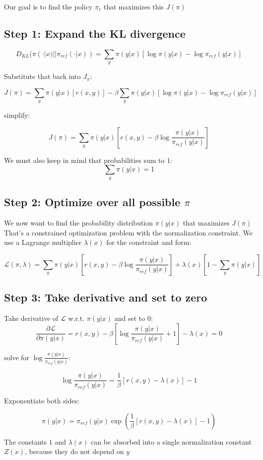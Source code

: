 \documentclass[]{article}
\begin{document}
Our goal is to find the policy $\pi_{r}$ that maximizes this $J(\pi)$
\subsection{Step 1: Expand the KL divergence}

$$
D_{KL}(\pi(\cdot|x) || \pi_{ref}(\cdot|x)) = \sum_{y}\pi(y|x)[\log\pi(y|x) - \log\pi_{ref}(y|x)]
$$

Substitute that back into $J_{\pi}$:

$$
J(\pi) = \sum_{y}\pi(y|x)[r(x,y)] - \beta\sum_{y}\pi(y|x)[\log\pi(y|x) - \log\pi_{ref}(y|x)]
$$

simplify:

$$
J(\pi) = \sum_{y}\pi(y|x)[r(x,y) - \beta\log\frac{\pi(y|x)}{\pi_{ref}(y|x)} ]
$$

We must also keep in mind that probabilities sum to 1:
$$
\sum_{y}\pi(y|x) = 1
$$

\subsection{Step 2: Optimize over all possible $\pi$}

We now want to find the probability distribution $\pi(y|x)$ that maximizes $J(\pi)$
That’s a constrained optimization problem with the normalization constraint.
We use a Lagrange multiplier $\lambda(x)$ for the constraint and form:

$$
\mathcal{L}(\pi, \lambda) = \sum_{y}\pi(y|x)[r(x,y) - \beta\log\frac{\pi(y|x)}{\pi_{ref}(y|x)} ] + \lambda(x)[1 - \sum_{y}\pi(y|x)]
$$

\subsection{Step 3: Take derivative and set to zero}

Take derivative of $\mathcal{L}$ w.r.t. $\pi(y|x)$ and set to 0:
$$
    \frac{\partial\mathcal{L}}{\partial \pi(y|x)} = r(x,y) - \beta[\log\frac{\pi(y|x)}{\pi_{ref}(y|x)} + 1] - \lambda(x) = 0
$$

solve for $\log\frac{\pi(y|x)}{\pi_{ref}(y|x)}$:

$$
\log\frac{\pi(y|x)}{\pi_{ref}(y|x)} =  \frac{1}{\beta}[r(x,y) - \lambda(x)] - 1
$$

Exponentiate both sides:

$$
\pi(y|x) = \pi_{ref}(y|x)\exp({\frac{1}{\beta}[r(x,y) - \lambda(x)] - 1})
$$

The constants $1$ and $\lambda(x)$ 
can be absorbed into a single normalization constant $Z(x)$, because they do not depend on $y$
\end{document}
